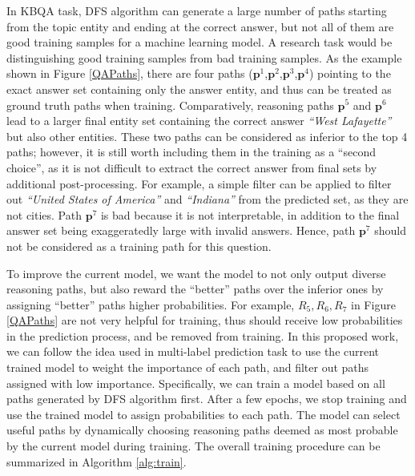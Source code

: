 In KBQA task, DFS algorithm can generate a large number of paths starting from the topic entity and ending at the correct answer, but not all of them are good training samples for a machine learning model. A research task would be distinguishing good training samples from bad training samples. As the example shown in Figure \ref{QAPaths}, there are four paths ($\mathbf{p}^1$,$\mathbf{p}^2$,$\mathbf{p}^3$,$\mathbf{p}^4$) pointing to the exact answer set containing only the answer entity, and thus can be treated as ground truth paths when training. Comparatively, reasoning paths $\mathbf{p}^5$ and $\mathbf{p}^6$ lead to a larger final entity set containing the correct answer \textit{``West Lafayette''} but also other entities. These two paths can be considered as inferior to the top 4 paths; however, it is still worth including them in the training as a ``second choice'', as it is not difficult to extract the correct answer from final sets by additional post-processing. For example, a simple filter can be applied to filter out \textit{``United States of America''} and \textit{``Indiana''} from the predicted set, as they are not cities. Path $\mathbf{p}^7$ is bad because it is not interpretable, in addition to the final answer set being exaggeratedly large with invalid answers. Hence, path $\mathbf{p}^7$ should not be considered as a training path for this question. %

To improve the current model, we want the model to not only output diverse reasoning paths, but also reward the ``better'' paths over the inferior ones by assigning ``better'' paths higher probabilities. For example, $R_5, R_6, R_7$ in Figure \ref{QAPaths} are not very helpful for training, thus should receive low probabilities in the prediction process, and be removed from training. In this proposed work, we can follow the idea used in multi-label prediction task to use the current trained model to weight the importance of each path, and filter out paths assigned with low importance. Specifically, we can train a model based on all paths generated by DFS algorithm first. After a few epochs, we stop training and use the trained model to assign probabilities to each path. The model can select useful paths by dynamically choosing reasoning paths deemed as most probable by the current model during training. The overall training procedure can be summarized in Algorithm \ref{alg:train}.


